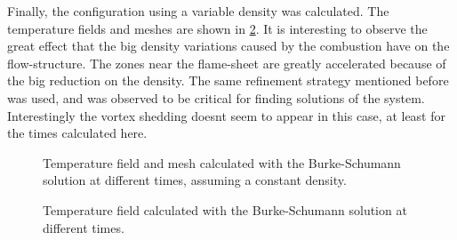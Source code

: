 Finally, the configuration using a variable density was calculated. The temperature fields and meshes are shown in \cref{fig:CombustionOverCylinder}. It is interesting to observe the great effect that the big density variations caused by the combustion have on the flow-structure. The zones near the flame-sheet are greatly accelerated because of the big reduction on the density. The same refinement strategy mentioned before was used, and was observed to be critical for finding solutions of the system.
Interestingly the vortex shedding doesnt seem to appear in this case, at least for the times calculated here. 




\begin{figure}[p]
	\centering
	\par\bigskip%
	\par\bigskip%
	\caption{Temperature field and mesh calculated with the Burke-Schumann solution at different times, assuming a constant density.} \label{fig:CombustionOverCylinder_CD}
\end{figure}


\begin{figure}[p]
	\centering
	\par\bigskip%
	\par\bigskip%
	\caption{Temperature field calculated with the Burke-Schumann solution at different times.} \label{fig:CombustionOverCylinder}
\end{figure}

